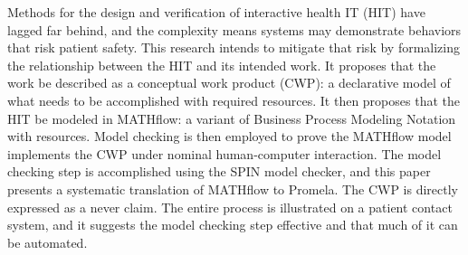 Methods for the design and verification of interactive health IT (HIT) have lagged far behind, and the complexity means systems may demonstrate behaviors that risk patient safety. This research intends to mitigate that risk by formalizing the relationship between the HIT and its intended work. It proposes that the work be described as a conceptual work product (CWP): a declarative model of what needs to be accomplished with required resources. It then proposes that the HIT be modeled in MATHflow: a variant of Business Process Modeling Notation with resources. Model checking is then employed to prove the MATHflow model implements the CWP under nominal human-computer interaction. The model checking step is accomplished using the SPIN model checker, and this paper presents a systematic translation of MATHflow to Promela. The CWP is directly expressed as a never claim. The entire process is illustrated on a patient contact system, and it suggests the model checking step effective and that much of it can be automated.
